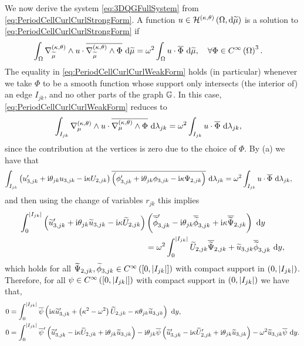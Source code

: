 We now derive the system \eqref{eq:3DQGFullSystem} from \eqref{eq:PeriodCellCurlCurlStrongForm}.
A function $u\in\mathcal{H}^{\left( \kappa, \theta \right)}\left( \Omega, \mathrm{d}\widetilde{\mu} \right)$ is a solution to \eqref{eq:PeriodCellCurlCurlStrongForm} if
\begin{align} \label{eq:PeriodCellCurlCurlWeakForm}
	\int_{\Omega} \nabla_{\widetilde{\mu}}^{\left( \kappa, \theta \right)}\wedge u\cdot\overline{\nabla_{\widetilde{\mu}}^{\left( \kappa, \theta \right)}\wedge\Phi}  \ \mathrm{d}\widetilde{\mu} &= \omega^2 \int_{\Omega} u\cdot\overline{\Phi}  \ \mathrm{d}\widetilde{\mu},
	\quad\forall \Phi\in C^{\infty}\left( \Omega \right)^3.
\end{align}
The equality in \eqref{eq:PeriodCellCurlCurlWeakForm} holds (in particular) whenever we take $\Phi$ to be a smooth function whose support only intersects (the interior of) an edge $I_{jk}$, and no other parts of the graph $\mathbb{G}$.
In this case, \eqref{eq:PeriodCellCurlCurlWeakForm} reduces to
\begin{align*}
	\int_{I_{jk}} \nabla_{\mu}^{\left( \kappa, \theta \right)}\wedge u\cdot\overline{\nabla_{\mu}^{\left( \kappa, \theta \right)}\wedge\Phi}  \ \mathrm{d}\lambda_{jk} &= \omega^2 \int_{I_{jk}} u\cdot\overline{\Phi}  \ \mathrm{d}\lambda_{jk},
\end{align*}
since the contribution at the vertices is zero due to the choice of $\Phi$.
By (a) we have that
\begin{align*}
	\int_{I_{jk}} \left( u'_{3,jk} + \mathrm{i}\theta_{jk} u_{3,jk} - \mathrm{i}\kappa U_{2,jk} \right)\overline{\left( \phi'_{3,jk} + \mathrm{i}\theta_{jk} \phi_{3,jk} - \mathrm{i}\kappa \Psi_{2,jk} \right)}  \ \mathrm{d}\lambda_{jk}
	&= \omega^2 \int_{I_{jk}} u\cdot\overline{\Phi}  \ \mathrm{d}\lambda_{jk},
\end{align*}
and then using the change of variables $r_{jk}$ this implies
\begin{align*} 
	\int_0^{\left\lvert I_{jk} \right\rvert} \left(  \widetilde{u}'_{3,jk} + \mathrm{i}\theta_{jk} \widetilde{u}_{3,jk} - \mathrm{i}\kappa \widetilde{U}_{2,jk}  \right) & \left(  \overline{\widetilde{\phi}}'_{3,jk} - \mathrm{i}\theta_{jk} \overline{\widetilde{\phi}}_{3,jk} + \mathrm{i}\kappa \overline{\widetilde{\Psi}}_{2,jk}  \right) \ \mathrm{d} y 
	\\
	&= \omega^2 \int_0^{\left\lvert I_{jk} \right\rvert} \widetilde{U}_{2,jk}\overline{\widetilde{\Psi}}_{2,jk} + \widetilde{u}_{3,jk}\overline{\widetilde{\phi}}_{3,jk} \ \mathrm{d} y,
\end{align*}
which holds for all $\widetilde{\Psi}_{2,jk}, \widetilde{\phi}_{3,jk}\in C^{\infty}\left( \left[ 0,\left\lvert I_{jk} \right\rvert \right] \right)$ with compact support in $\left( 0,\left\lvert I_{jk} \right\rvert \right)$.
Therefore, for all $\psi\in C^{\infty}\left( \left[ 0,\left\lvert I_{jk} \right\rvert \right] \right)$ with compact support in $\left( 0,\left\lvert I_{jk} \right\rvert \right)$ we have that,
\begin{subequations}
	\begin{align}
		0 &= \int_0^{\left\lvert I_{jk} \right\rvert} \overline{\psi} \left(  \mathrm{i}\kappa\widetilde{u}'_{3,jk} + \left( \kappa^2 - \omega^2 \right)\widetilde{U}_{2,jk} - \kappa\theta_{jk}\widetilde{u}_{3,jk}   \right) \ \mathrm{d} y, \label{eq:CurlCurlWeakFormPhi2} \\
		0 &= \int_0^{\left\lvert I_{jk} \right\rvert} \overline{\psi}' \left(  \widetilde{u}'_{3,jk} - \mathrm{i}\kappa\widetilde{U}_{2,jk} + \mathrm{i}\theta_{jk}\widetilde{u}_{3,jk}  \right)
		-\mathrm{i}\theta_{jk}\overline{\psi}\left(  \widetilde{u}'_{3,jk} - \mathrm{i}\kappa\widetilde{U}'_{2,jk} + \mathrm{i}\theta_{jk}\widetilde{u}_{3,jk}  \right)
		- \omega^2 \widetilde{u}_{3,jk}\overline{\psi} \ \mathrm{d} y. \label{eq:CurlCurlWeakFormPhi3}
	\end{align}
\end{subequations}
